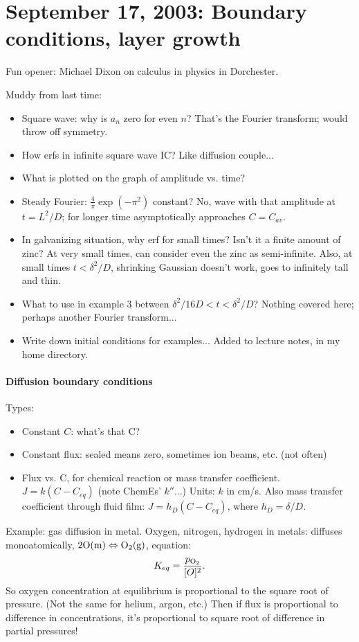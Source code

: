 \documentclass{report}
\begin{document}
\section{September 17, 2003: Boundary conditions, layer growth}

\noindent Fun opener: Michael Dixon on calculus in physics in Dorchester.

Muddy from last time:
\begin{itemize}
\item Square wave: why is $a_n$ zero for even $n$?  That's the Fourier
  transform; would throw off symmetry.
\item How erfs in infinite square wave IC?  Like diffusion couple...
\item What is plotted on the graph of amplitude vs. time?
\item Steady Fourier: $\frac{4}{\pi}\exp(-\pi^2)$ constant?  No, wave with that
  amplitude at $t=L^2/D$; for longer time asymptotically approaches $C=C_{av}$.
\item In galvanizing situation, why erf for small times?  Isn't it a finite
  amount of zinc?  At very small times, can consider even the zinc as
  semi-infinite.  Also, at small times $t<\delta^2/D$, shrinking Gaussian
  doesn't work, goes to infinitely tall and thin.
\item What to use in example 3 between $\delta^2/16D<t<\delta^2/D$?  Nothing
  covered here; perhaps another Fourier transform...
\item Write down initial conditions for examples...  Added to lecture notes, in
  my home directory.
\end{itemize}

\paragraph{Diffusion boundary conditions}

Types:
\begin{itemize}
\item Constant $C$: what's that C?
\item Constant flux: sealed means zero, sometimes ion beams, etc. (not often)
\item Flux vs. C, for chemical reaction or mass transfer coefficient.  $J=k
  (C-C_{eq})$ (note ChemEs' $k''$...)  Units: $k$ in cm/s.  Also mass transfer
  coefficient through fluid film: $J=h_D (C-C_{eq})$, where $h_D = \delta/D$.
\end{itemize}

Example: gas diffusion in metal.  Oxygen, nitrogen, hydrogen in metals:
diffuses monoatomically, $\rm 2 O(m) \Leftrightarrow O_2(g)$, equation:
\begin{equation}
  \label{eq:diatomic}
  K_{eq} = \frac{p_{\rm O_2}}{[O]^2}.
\end{equation}
So oxygen concentration at equilibrium is proportional to the square root of
pressure.  (Not the same for helium, argon, etc.)  Then if flux is proportional
to difference in concentrations, it's proportional to square root of difference
in partial pressures!
\end{document}
